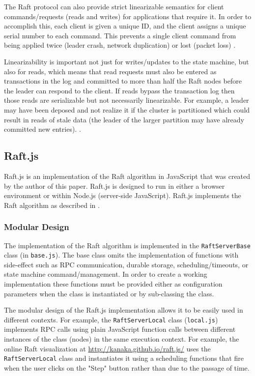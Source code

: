 \documentclass[9pt]{extarticle}
\begin{document}
\begin{multicols}{2}
The Raft protocol can also provide strict linearizable semantics for
client commands/requests (reads and writes) for applications that
require it. In order to accomplish this, each client is given a unique
ID, and the client assigns a unique serial number to each command.
This prevents a single client command from being applied twice (leader
crash, network duplication) or lost (packet loss)
\cite[Section~6.3]{raft_thesis:ongaro14}.

Linearizability is important not just for writes/updates to the state
machine, but also for reads, which means that read requests must also
be entered as transactions in the log and committed to more than half
the Raft nodes before the leader can respond to the client. If reads
bypass the transaction log then those reads are serializable but not
necessarily linearizable. For example, a leader may have been deposed
and not realize it if the cluster is partitioned which could result in
reads of stale data (the leader of the larger partition may have
already committed new entries).
\cite[Section~6.4]{raft_thesis:ongaro14}.

\subsection{Raft.js}

Raft.js is an implementation of the Raft algorithm in JavaScript that
was created by the author of this paper. %
Raft.js is designed to run in either a browser environment or within
Node.js (server-side JavaScript). Raft.js implements the Raft
algorithm as described in \cite[Consensus:~Diego]{raft_thesis:ongaro14}.

\subsubsection{Modular Design}

The implementation of the Raft algorithm is implemented in the
\texttt{RaftServerBase} class (in \texttt{base.js}). The base class
omits the implementation of functions with side-effect such as RPC
communication, durable storage, scheduling/timeouts, or state machine
command/management. In order to create a working implementation these
functions must be provided either as configuration parameters when the
class is instantiated or by sub-classing the class.

The modular design of the Raft.js implementation allows it to be
easily used in different contexts. For example, the \texttt{RaftServerLocal}
class (\texttt{local.js}) implements RPC calls using plain JavaScript function
calls between different instances of the class (nodes) in the same
execution context. For example, the online Raft visualization at
\href{http://kanaka.github.io/raft.js/}{http://kanaka.github.io/raft.js/}
uses the \texttt{RaftServerLocal} class and instantiates it using
a scheduling functions that fire when the user clicks on the "Step"
button rather than due to the passage of time.


\end{multicols}
\end{document}
